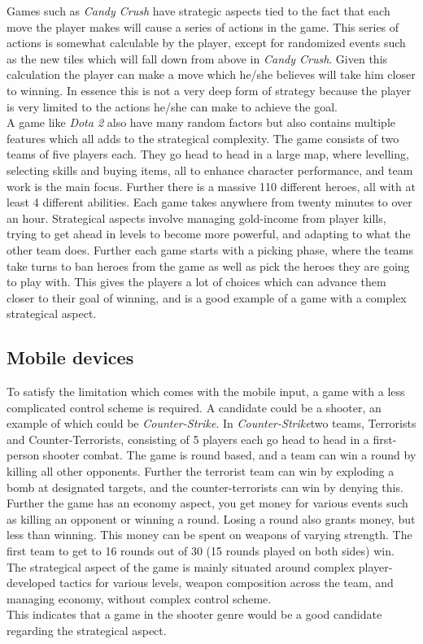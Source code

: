Games such as \textit{Candy Crush}\cite{candycrush} have strategic aspects tied to the fact that each move the player makes will cause a series of actions in the game.
This series of actions is somewhat calculable by the player, except for randomized events such as the new tiles which will fall down from above in \textit{Candy Crush}.
Given this calculation the player can make a move which he/she believes will take him closer to winning.
In essence this is not a very deep form of strategy because the player is very limited to the actions he/she can make to achieve the goal.\\
A game like \textit{Dota 2}\cite{Dota2} also have many random factors but also contains multiple features which all adds to the strategical complexity.
The game consists of two teams of five players each. 
They go head to head in a large map, where levelling, selecting skills and buying items, all to enhance character performance, and team work is the main focus. 
Further there is a massive 110 different heroes, all with at least 4 different abilities. 
Each game takes anywhere from twenty minutes to over an hour. 
Strategical aspects involve managing gold-income from player kills, trying to get ahead in levels to become more powerful, and adapting to what the other team does. 
Further each game starts with a picking phase, where the teams take turns to ban heroes from the game as well as pick the heroes they are going to play with.
This gives the players a lot of choices which can advance them closer to their goal of winning, and is a good example of a game with a complex strategical aspect.

\subsection{Mobile devices}
To satisfy the limitation which comes with the mobile input, a game with a less complicated control scheme is required.
A candidate could be a shooter, an example of which could be \textit{Counter-Strike}. \cite{counterstrike}
In \textit{Counter-Strike}two teams, Terrorists and Counter-Terrorists, consisting of 5 players each go head to head in a first-person shooter combat. 
The game is round based, and a team can win a round by killing all other opponents. 
Further the terrorist team can win by exploding a bomb at designated targets, and the counter-terrorists can win by denying this. 
Further the game has an economy aspect, you get money for various events such as killing an opponent or winning a round.
Losing a round also grants money, but less than winning.
This money can be spent on weapons of varying strength.
The first team to get to 16 rounds out of 30 (15 rounds played on both sides) win. 
The strategical aspect of the game is mainly situated around complex player-developed tactics for various levels, weapon composition across the team, and managing economy, without complex control scheme.\\
This indicates that a game in the shooter genre would be a good candidate regarding the strategical aspect.